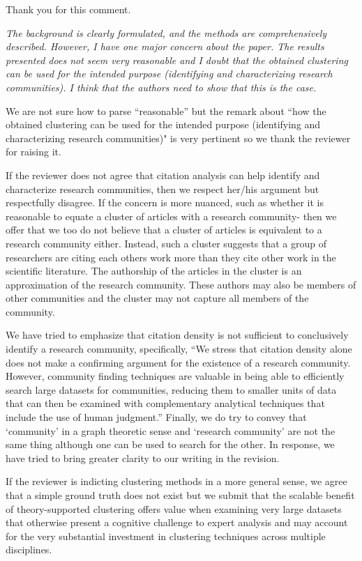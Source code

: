 \documentclass[11pt, oneside]{article}   	%
\begin{document}
Thank you for this comment.

\emph{The background is clearly formulated, and the methods are comprehensively described. However, I have one major concern about the paper. The results presented does not seem very reasonable and I doubt that the obtained clustering can be used for the intended purpose (identifying and characterizing research communities). I think that the authors need to show that this is the case.}

We are not sure how to parse ``reasonable'' but the remark about ``how the obtained clustering can be used for the intended purpose (identifying and characterizing research communities)" is very pertinent so we thank the reviewer for raising it.

If the reviewer does not agree that citation analysis can help identify and characterize research communities, then we respect her/his argument but respectfully disagree. If the concern is more nuanced, such as whether it is reasonable to equate a cluster of articles with a research community-  then we offer that we too do not believe that a cluster of articles is equivalent to a research community either. Instead, such a cluster suggests that a group of researchers are citing each others work more than they cite other work in the scientific literature. The authorship of the articles in the cluster is an approximation of the research community. These authors may also be members of other communities and the cluster may not capture all members of the community. 

We have tried to emphasize that citation density is not sufficient to conclusively identify a research community, specifically, ``We stress that citation density alone does not make a confirming argument for the existence of a research community. However, community finding techniques are valuable in being able to efficiently search large datasets for communities, reducing them to smaller units of data that can then be examined with complementary analytical techniques that include the use of human judgment.'' Finally, we do try to convey that `community' in a graph theoretic sense and `research community' are not the same thing although one can be used to search for the other.  In response, we have tried to bring greater clarity to our writing in the revision. 

If the reviewer is indicting clustering methods in a more general sense, we agree that a simple ground truth does not exist but we submit that the scalable benefit of theory-supported clustering offers value when examining very large datasets that otherwise present a cognitive challenge to expert analysis and may account for the very substantial investment in clustering techniques across multiple disciplines. 
\end{document}
